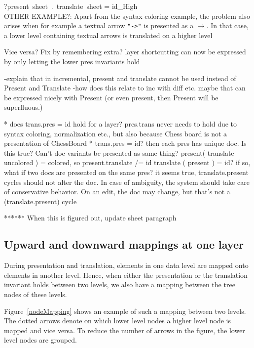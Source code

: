 
\bc
?present~sheet~.~translate~sheet = id_{High}\\

OTHER EXAMPLE?: Apart from the syntax coloring example, the problem also arises when for example a textual arrow 
\verb|"->"| is presented as a $\rightarrow$. In that case, a lower level containing textual arrows is 
translated on a higher level 

Vice versa? Fix by remembering extra?
 layer shortcutting can now be expressed by only letting the lower pres invariants hold

 -explain that in incremental, present and translate cannot be used instead of Present and Translate
 -how does this relate to inc with diff etc. maybe that can be expressed nicely with Present
 (or even present, then Present will be superfluous.)

* does   trans.pres = id hold for a layer? pres.trans never needs to hold due to syntax coloring, normalization etc., but also because Chess board is not a presentation of ChessBoard   
* trans.pres = id? then each pres has unique doc. Is this true? Can't doc variants be presented as same thing?
   present( translate uncolored ) = colored, so present.translate /= id
   translate ( present ) = id? if so, what if two docs are presented on the same pres?
 it seems true, translate.present cycles should not alter the doc. In case of ambiguity, the system should
 take care of conservative behavior. On an edit, the doc may change, but that's not a (translate.present) cycle


 ****** When this is figured out, update sheet paragraph
\ec


%																
\subsection{Upward and downward mappings at one layer} \label{mappingsInLayer}


During presentation and translation, elements in one data level are mapped onto elements in another level. Hence, when either the presentation or the translation invariant holds between two levels, we also have a mapping between the tree nodes of these levels. 

Figure~\ref{nodeMapping} shows an example of such a mapping between two levels. The dotted arrows denote on which lower level nodes a higher level node is mapped and vice versa. To reduce the number of arrows in the figure, the lower level nodes are grouped.

